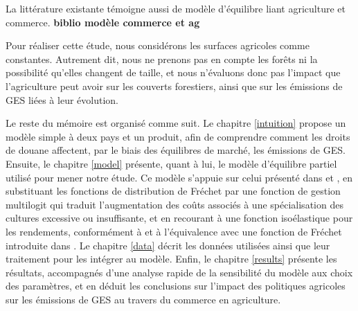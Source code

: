 La littérature existante témoigne aussi de modèle d'équilibre liant agriculture et commerce. \textbf{biblio modèle commerce et ag}




Pour réaliser cette étude, nous considérons les surfaces agricoles comme constantes. Autrement dit, nous ne prenons pas en compte les forêts ni la possibilité qu'elles changent de taille, et nous n'évaluons donc pas l’impact que l’agriculture peut avoir sur les couverts forestiers, ainsi que sur les émissions de GES liées à leur évolution.

Le reste du mémoire est organisé comme suit. Le chapitre \ref{intuition} propose un modèle simple à deux pays et un produit, afin de comprendre comment les droits de douane affectent, par le biais des équilibres de marché, les émissions de GES. Ensuite, le chapitre \ref{model} présente, quant à lui, le modèle d’équilibre partiel utilisé pour mener notre étude. Ce modèle s’appuie sur celui présenté dans \cite{Gouel2021} et \cite{Gouel2025}, en substituant les fonctions de distribution de Fréchet par une fonction de gestion multilogit qui traduit l’augmentation des coûts associés à une spécialisation des cultures excessive ou insuffisante, et en recourant à une fonction isoélastique pour les rendements, conformément à \cite{Carpentier2013} et à l’équivalence avec une fonction de Fréchet introduite dans \cite{Gouel202x}. Le chapitre \ref{data} décrit les données utilisées ainsi que leur traitement pour les intégrer au modèle. Enfin, le chapitre \ref{results} présente les résultats, accompagnés d’une analyse rapide de la sensibilité du modèle aux choix des paramètres, et en déduit les conclusions sur l’impact des politiques agricoles sur les émissions de GES au travers du commerce en agriculture.


